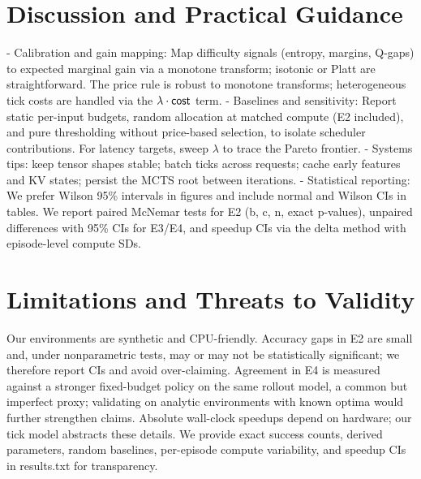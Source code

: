 \section{Discussion and Practical Guidance}
\label{sec:guidance}
- Calibration and gain mapping: Map difficulty signals (entropy, margins, Q-gaps) to expected marginal gain via a monotone transform; isotonic or Platt \cite{Platt1999} are straightforward. The price rule is robust to monotone transforms; heterogeneous tick costs are handled via the $\lambda \cdot \mathsf{cost}$ term.
- Baselines and sensitivity: Report static per-input budgets, random allocation at matched compute (E2 included), and pure thresholding without price-based selection, to isolate scheduler contributions. For latency targets, sweep $\lambda$ to trace the Pareto frontier.
- Systems tips: keep tensor shapes stable; batch ticks across requests; cache early features and KV states; persist the MCTS root between iterations.
- Statistical reporting: We prefer Wilson 95\% intervals in figures and include normal and Wilson CIs in tables. We report paired McNemar tests for E2 (b, c, n, exact p-values), unpaired differences with 95\% CIs for E3/E4, and speedup CIs via the delta method with episode-level compute SDs.

\section{Limitations and Threats to Validity}
Our environments are synthetic and CPU-friendly. Accuracy gaps in E2 are small and, under nonparametric tests, may or may not be statistically significant; we therefore report CIs and avoid over-claiming. Agreement in E4 is measured against a stronger fixed-budget policy on the same rollout model, a common but imperfect proxy; validating on analytic environments with known optima would further strengthen claims. Absolute wall-clock speedups depend on hardware; our tick model abstracts these details. We provide exact success counts, derived parameters, random baselines, per-episode compute variability, and speedup CIs in results.txt for transparency.

